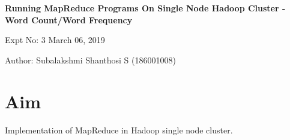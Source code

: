 \documentclass[a4paper,10pt]{article}
\begin{document}
\setcounter{secnumdepth}{-1} 

\begin{center}
\textbf{\LARGE Running MapReduce Programs On Single Node Hadoop Cluster - Word Count/Word Frequency}
\end{center}

\raggedright Expt No: 3 \hfill \raggedleft March  06, 2019 \\ 

\raggedright Author: Subalakshmi Shanthosi S  (186001008) \par 

\noindent\makebox[\linewidth]{\rule{\textwidth}{1pt}} 

\section{Aim}
Implementation of MapReduce in Hadoop single node cluster.
\end{document}
